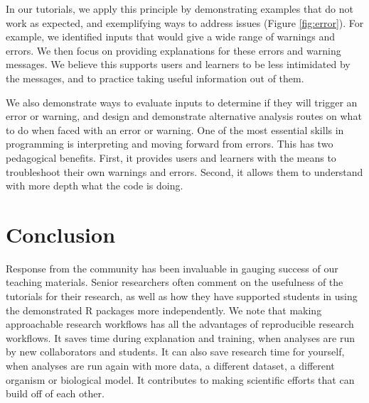 \documentclass[12pt]{article}
\begin{document}
In our tutorials, we apply this principle by demonstrating examples that do not work as expected, and exemplifying ways to address issues (Figure \ref{fig:error}).
For example, we identified inputs that would give a wide range of warnings and errors.
We then focus on providing explanations for these errors and warning messages.
We believe this supports users and learners to be less intimidated by the messages, and to practice taking useful information out of them.

We also demonstrate ways to evaluate inputs to determine if they will trigger an error or warning, and design and demonstrate alternative analysis routes on what to do when faced with an error or warning.
One of the most essential skills in programming is interpreting and moving forward from errors.
This has two pedagogical benefits.
First, it provides users and learners with the means to troubleshoot their own warnings and errors.
Second, it allows them to understand with more depth what the code is doing.








\section*{Conclusion}
\label{sec:conclusion}

Response from the community has been invaluable in gauging success of our teaching materials.
Senior researchers often comment on the usefulness of the tutorials for their research, as well as how they have supported students in using the demonstrated R packages more independently.
We note that making approachable research workflows has all the advantages of reproducible research workflows.
It saves time during explanation and training, when analyses are run by new collaborators and students.
It can also save research time for yourself, when analyses are run again with more data, a different dataset, a different organism or biological model.
It contributes to making scientific efforts that can build off of each other.
\end{document}
